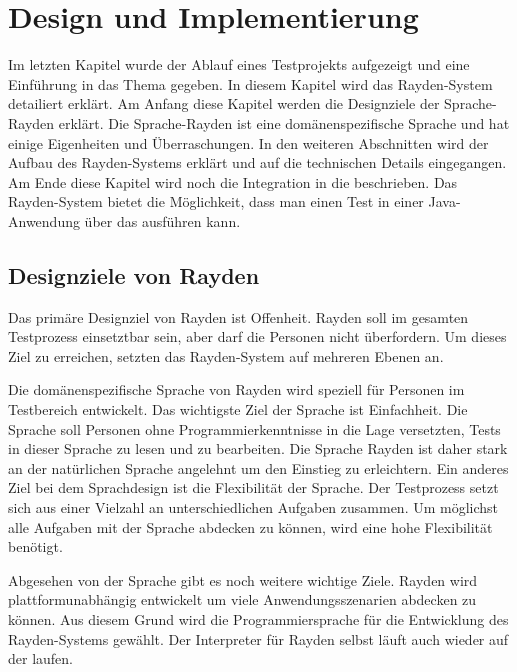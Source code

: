 \chapter{Design und Implementierung}
\label{cha:DesignUndImplementierung}

Im letzten Kapitel wurde der Ablauf eines Testprojekts aufgezeigt und eine Einführung in das Thema  gegeben. In diesem Kapitel wird das Rayden-System detailiert erklärt. Am Anfang diese Kapitel werden die Designziele der Sprache-Rayden erklärt. Die Sprache-Rayden ist eine domänenspezifische Sprache und hat einige Eigenheiten und Überraschungen. In den weiteren Abschnitten wird der Aufbau des Rayden-Systems erklärt und auf die technischen Details eingegangen. Am Ende diese Kapitel wird noch die Integration in die  beschrieben. Das Rayden-System bietet die Möglichkeit, dass man einen Test in einer Java-Anwendung über das  ausführen kann.

\section{Designziele von Rayden}

Das primäre Designziel von Rayden ist Offenheit. Rayden soll im gesamten Testprozess einsetztbar sein, aber darf die Personen nicht überfordern. Um dieses Ziel zu erreichen, setzten das Rayden-System auf mehreren Ebenen an.

\SuperPar
Die domänenspezifische Sprache von Rayden wird speziell für Personen im Testbereich entwickelt. Das wichtigste Ziel der Sprache ist Einfachheit. Die Sprache soll Personen ohne Programmierkenntnisse in die Lage versetzten, Tests in dieser Sprache zu lesen und zu bearbeiten. Die Sprache Rayden ist daher stark an der natürlichen Sprache angelehnt um den Einstieg zu erleichtern. Ein anderes Ziel bei dem Sprachdesign ist die Flexibilität der Sprache. Der Testprozess setzt sich aus einer Vielzahl an unterschiedlichen Aufgaben zusammen. Um möglichst alle Aufgaben mit der Sprache abdecken zu können, wird eine hohe Flexibilität benötigt. 

\SuperPar
Abgesehen von der Sprache gibt es noch weitere wichtige Ziele. Rayden wird plattformunabhängig entwickelt um viele Anwendungsszenarien abdecken zu können. Aus diesem Grund wird die Programmiersprache  für die Entwicklung des Rayden-Systems gewählt. Der Interpreter für Rayden selbst läuft auch wieder auf der  laufen.

